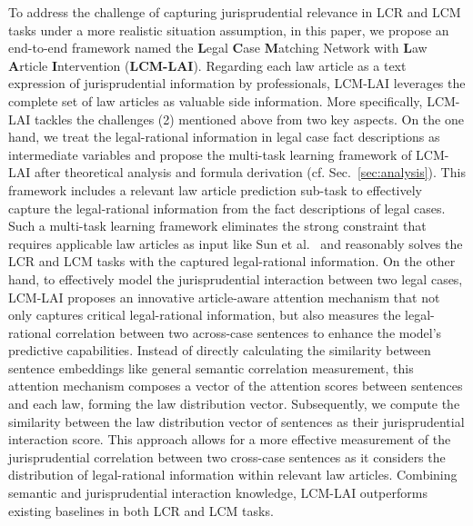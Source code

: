 To address the challenge of capturing jurisprudential relevance in LCR and LCM tasks under a more realistic situation assumption, in this paper, we propose an end-to-end framework named the \textbf{L}egal \textbf{C}ase \textbf{M}atching Network with \textbf{L}aw \textbf{A}rticle \textbf{I}ntervention (\textbf{LCM-LAI}). 
Regarding each law article as a text expression of jurisprudential information by professionals, LCM-LAI leverages the complete set of law articles as valuable side information.
More specifically, LCM-LAI tackles the challenges (2) mentioned above from two key aspects.
On the one hand, we treat the legal-rational information in legal case fact descriptions as intermediate variables and propose the multi-task learning framework of LCM-LAI after theoretical analysis and formula derivation (cf. Sec.~\ref{sec:analysis}).
This framework includes a relevant law article prediction sub-task to effectively capture the legal-rational information from the fact descriptions of legal cases.
Such a multi-task learning framework eliminates the strong constraint that requires applicable law articles as input like Sun et al.~\cite{sun2023law} and reasonably solves the LCR and LCM tasks with the captured legal-rational information.
On the other hand, to effectively model the jurisprudential interaction between two legal cases, LCM-LAI proposes an innovative article-aware attention mechanism that not only captures critical legal-rational information, but also measures the legal-rational correlation between two across-case sentences to enhance the model’s predictive capabilities.
Instead of directly calculating the similarity between sentence embeddings like general semantic correlation measurement, this attention mechanism composes a vector of the attention scores between sentences and each law, forming the law distribution vector. 
Subsequently, we compute the similarity between the law distribution vector of sentences as their jurisprudential interaction score.
This approach allows for a more effective measurement of the jurisprudential correlation between two cross-case sentences as it considers the distribution of legal-rational information within relevant law articles. 
Combining semantic and jurisprudential interaction knowledge, LCM-LAI outperforms existing baselines in both LCR and LCM tasks.

